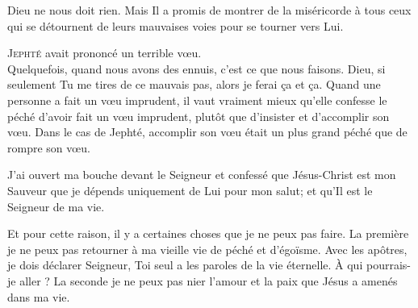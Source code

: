 Dieu ne nous doit rien. Mais Il a promis de montrer de la miséricorde
 à tous ceux qui se détournent de leurs mauvaises voies
 pour se tourner vers Lui. 

\dvrule







\lettrine{J}{ephté} avait prononcé un terrible v\oe{}u. \\[1ex]
Quelquefois, quand nous avons des ennuis, c'est ce que nous faisons.
 \Og Dieu, si seulement Tu me tires de ce mauvais pas,
 alors je ferai \c{c}a et \c{c}a. \Fg{}
 Quand une personne a fait un v\oe{}u imprudent,
 il vaut vraiment mieux qu'elle confesse le péché d'avoir fait un v\oe{}u imprudent,
 plutôt que d'insister et d'accomplir son v\oe{}u.
 Dans le cas de Jephté, accomplir son v\oe{}u était un plus grand péché
 que de rompre son v\oe{}u.


J'ai ouvert ma bouche devant le Seigneur et confessé que Jésus-Christ
 est mon Sauveur\frcolon{} que je dépends uniquement de Lui pour mon salut;
 et qu'Il est le Seigneur de ma vie.

Et pour cette raison, il y a certaines choses que je ne peux pas faire.
 La première\frcolon{} je ne peux pas retourner à ma vieille vie de péché et d'égoïsme.
 Avec les apôtres, je dois déclarer\frcolon{}
 \Og Seigneur, Toi seul a les paroles de la vie éternelle.
 \`A qui pourrais-je aller ? \Fg{}
 La seconde\frcolon{} je ne peux pas nier l'amour et la paix que Jésus
 a amenés dans ma vie. 

